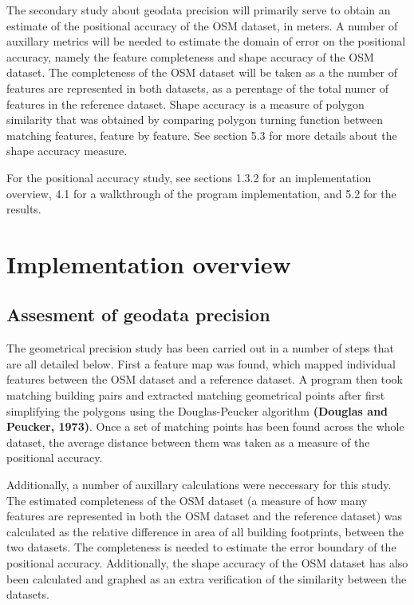 \documentclass{kththesis}
\begin{document}
The secondary study about geodata precision will primarily serve to obtain an estimate of the positional accuracy of the OSM dataset, in meters.
A number of auxillary metrics will be needed to estimate the domain of error on the positional accuracy, namely the feature completeness and shape accuracy of the OSM dataset.
The completeness of the OSM dataset will be taken as a the number of features are represented in both datasets, as a perentage of the total numer of features in the reference dataset.
Shape accuracy is a measure of polygon similarity that was obtained by comparing polygon turning function between matching features, feature by feature.
See section 5.3 for more details about the shape accuracy measure.

For the positional accuracy study, see sections 1.3.2 for an implementation overview, 4.1 for a walkthrough of the program implementation, and 5.2 for the results.

\section{Implementation overview}

\subsection{Assesment of geodata precision}

The geometrical precision study has been carried out in a number of steps that are all detailed below.
First a feature map was found, which mapped individual features between the OSM dataset and a reference dataset.
A program then took matching building pairs and extracted matching geometrical points after first simplifying the polygons using the Douglas-Peucker algorithm \textbf{(Douglas and Peucker, 1973)}.
Once a set of matching points has been found across the whole dataset, the average distance between them was taken as a measure of the positional accuracy.

Additionally, a number of auxillary calculations were neccessary for this study.
The estimated completeness of the OSM dataset (a measure of how many features are represented in both the OSM dataset and the reference dataset) was calculated as the relative difference in area of all building footprints, between the two datasets.
The completeness is needed to estimate the error boundary of the positional accuracy.
Additionally, the shape accuracy of the OSM dataset has also been calculated and graphed as an extra verification of the similarity between the datasets.
\end{document}
